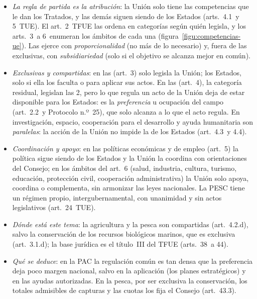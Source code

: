 \documentclass[11pt]{article}
\begin{document}
\begin{itemize}
\item \emph{La regla de partida es la atribución}: la Unión solo tiene las competencias que le dan los Tratados, y las demás siguen siendo de los Estados (arts.~4.1~y 5~TUE). El art.~2~TFUE las ordena en categorías según quién legisla, y los arts.~3~a 6~enumeran los ámbitos de cada una (figura~\ref{figu:competencias-ue}). Las ejerce con \emph{proporcionalidad} (no más de lo necesario) y, fuera de las exclusivas, con \emph{subsidiariedad} (solo si el objetivo se alcanza mejor en común).
\item \emph{Exclusivas y compartidas}: en las  (art.~3) solo legisla la Unión; los Estados, solo si ella los faculta o para aplicar sus actos. En las  (art.~4), la categoría residual, legislan las 2, pero lo que regula un acto de la Unión deja de estar disponible para los Estados: es la \emph{preferencia} u ocupación del campo (art.~2.2~y Protocolo n.º~25), que solo alcanza a lo que el acto regula. En investigación, espacio, cooperación para el desarrollo y ayuda humanitaria son \emph{paralelas}: la acción de la Unión no impide la de los Estados (art.~4.3~y 4.4).
\item \emph{Coordinación y apoyo}: en las políticas económicas y de empleo (art.~5) la política sigue siendo de los Estados y la Unión la coordina con orientaciones del Consejo; en los ámbitos del art.~6 (salud, industria, cultura, turismo, educación, protección civil, cooperación administrativa) la Unión solo apoya, coordina o complementa, sin armonizar las leyes nacionales. La PESC tiene un régimen propio, intergubernamental, con unanimidad y sin actos legislativos (art.~24~TUE).
\item \emph{Dónde está este tema}: la agricultura y la pesca son compartidas (art.~4.2.d), salvo la conservación de los recursos biológicos marinos, que es exclusiva (art.~3.1.d); la base jurídica es el título~III del TFUE (arts.~38~a 44).
\item \emph{Qué se deduce}: en la PAC la regulación común es tan densa que la preferencia deja poco margen nacional, salvo en la aplicación (los planes estratégicos) y en las ayudas autorizadas. En la pesca, por ser exclusiva la conservación, los totales admisibles de capturas y las cuotas los fija el Consejo (art.~43.3).
\end{itemize}

\begin{infografia}[H]
\centering
\caption{El reparto de competencias de la Unión (arts.~2~a 6~TFUE): la agricultura y la pesca}\label{figu:competencias-ue}
\end{infografia}
\end{document}
